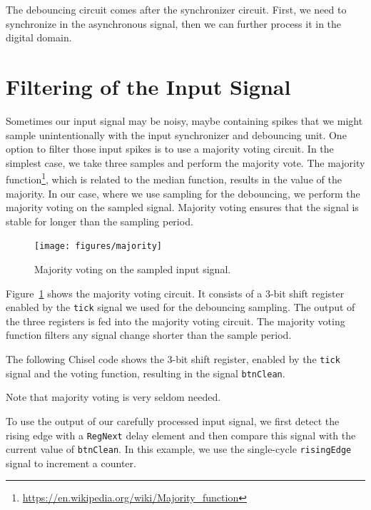 \documentclass[%
    10pt,
    headinclude, footexclude,
    openright, %
    notitlepage,
    cleardoubleempty,
    headsepline,
    pointlessnumbers,
    bibtotoc, idxtotoc,
    ]{scrbook}
\newcommand{\code}[1]{{\small{\texttt{#1}}}}
\newcommand{\myref}[2]{\href{#1}{#2}}
\renewcommand{\myref}[2]{{#2}{\footnote{\url{#1}}}}
\begin{document}
The debouncing circuit comes after the synchronizer circuit.
First, we need to synchronize in the asynchronous signal, then
we can further process it in the digital domain.

\section{Filtering of the Input Signal}


Sometimes our input signal may be noisy, maybe containing spikes
that we might sample unintentionally with the input synchronizer and
debouncing unit.
One option to filter those input spikes is to use a majority voting
circuit. In the simplest case, we take three samples and perform
the majority vote. The \myref{https://en.wikipedia.org/wiki/Majority_function}{majority function},
which is related to the median function, results in the value of the majority.
In our case, where we use sampling for the debouncing, we perform the
majority voting on the sampled signal.
Majority voting ensures that the signal is stable for longer than the sampling period.

\begin{figure}
  \centering
  \texttt{[image: figures/majority]}
  \caption{Majority voting on the sampled input signal.}
  \label{fig:majority}
\end{figure}

Figure~\ref{fig:majority} shows the majority voting circuit.
It consists of a 3-bit shift register enabled by the \code{tick} signal
we used for the debouncing sampling. The output of the three registers
is fed into the majority voting circuit. The majority voting function filters
any signal change shorter than the sample period.

The following Chisel code shows the 3-bit shift register, enabled by the
\code{tick} signal and the voting function, resulting in the signal \code{btnClean}.

Note that majority voting is very seldom needed.


To use the output of our carefully processed input signal, we first detect
the rising edge with a \code{RegNext} delay element and then compare this
signal with the current value of \code{btnClean}. In this example, we use
the single-cycle \code{risingEdge} signal to increment a counter.

\end{document}
